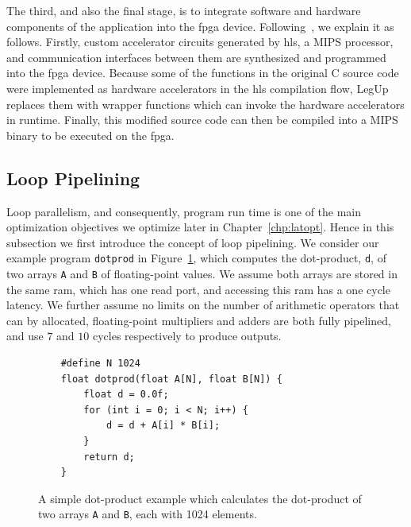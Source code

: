 The third, and also the final stage, is to integrate software and
hardware components of the application into the \gls{fpga} device.
Following~\cite{canis13}, we explain it as follows.  Firstly, custom
accelerator circuits generated by \gls{hls}, a MIPS processor, and
communication interfaces between them are synthesized and programmed into the
\gls{fpga} device.  Because some of the functions in the original C source
code were implemented as hardware accelerators in the \gls{hls} compilation
flow, LegUp replaces them with wrapper functions which can invoke the hardware
accelerators in runtime.  Finally, this modified source code can then be
compiled into a MIPS binary to be executed on the \gls{fpga}\@.


\subsection{Loop Pipelining}
\label{bg:sub:pipelining}

Loop parallelism, and consequently, program run time is one of the main
optimization objectives we optimize later in Chapter~\ref{chp:latopt}.  Hence
in this subsection we first introduce the concept of loop pipelining.  We
consider our example program \verb|dotprod| in Figure~\ref{bg:lst:dotprod},
which computes the dot-product, \verb|d|, of two arrays \verb|A| and \verb|B|
of floating-point values.  We assume both arrays are stored in the same
\gls{ram}, which has one read port, and accessing this \gls{ram} has a one
cycle latency.  We further assume no limits on the number of arithmetic
operators that can by allocated, floating-point multipliers and adders are both
fully pipelined, and use $7$ and $10$ cycles respectively to produce outputs.
\begin{figure}[ht]
    \centering
    \begin{lstlisting}
    #define N 1024
    float dotprod(float A[N], float B[N]) {
        float d = 0.0f;
        for (int i = 0; i < N; i++) {
            d = d + A[i] * B[i];
        }
        return d;
    }
    \end{lstlisting}
    \caption{%
        A simple dot-product example which calculates the dot-product of two
        arrays \texttt{A} and \texttt{B}, each with 1024 elements.
    }\label{bg:lst:dotprod}
\end{figure}


